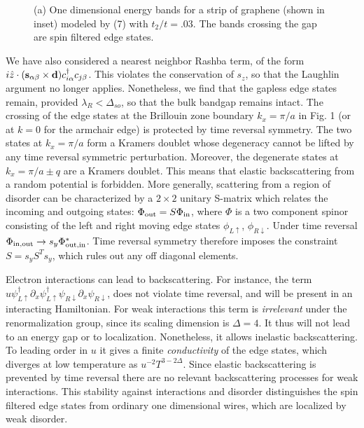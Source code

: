 \documentclass[twocolumn,showpacs,floatfix,prl]{revtex4}
\begin{document}
\begin{figure}
 \centerline{  }
 \caption{(a) One dimensional energy bands for a strip of graphene (shown in inset)
 modeled by (7) with $t_2/t=.03$.  The bands crossing the gap are spin filtered
  edge states.}
 \end{figure}

We have also considered a nearest neighbor Rashba term, of the form
$i\hat z\cdot({\bf s}_{\alpha\beta}\times{\bf d})c_{i\alpha}^\dagger
c_{j\beta}$.  This violates the conservation of $s_z$, so that the Laughlin
argument no longer applies.  Nonetheless, we find that the gapless
edge states remain, provided $\lambda_R<\Delta_{so}$, so that the bulk
bandgap remains intact.
The crossing of the edge states at the Brillouin zone boundary $k_x = \pi/a$ in
Fig. 1 (or at $k=0$ for the armchair edge) is protected by time
reversal symmetry.  The two states at $k_x=\pi/a$ form a Kramers
doublet whose degeneracy cannot be lifted by any time reversal
symmetric perturbation.  Moreover, the degenerate
states at $k_x = \pi/a \pm q$ are a Kramers doublet.  This means that
elastic backscattering from a random potential is forbidden.
More generally, scattering from a region of disorder can be characterized by a $2\times
2$ unitary S-matrix which relates the incoming and outgoing states:
$\Phi_{\rm out} = S \Phi_{\rm in}$, where $\Phi$ is a two component
spinor consisting of the left and right moving edge states
$\phi_{L\uparrow}$, $\phi_{R\downarrow}$.  Under time reversal
$\Phi_{\rm in,out} \rightarrow s_y \Phi^*_{\rm out,in}$.
Time reversal symmetry therefore imposes the constraint $S = s_y S^T s_y$, which
 rules out any off diagonal elements.

Electron interactions can lead to backscattering.
For instance, the term
$u \psi_{L\uparrow}^\dagger\partial_x \psi_{L\uparrow}^\dagger
\psi_{R\downarrow}\partial_x\psi_{R\downarrow}$,
does not violate time reversal, and will
be present in an interacting Hamiltonian.  For weak
interactions this term is {\it irrelevant} under the renormalization
group, since its scaling
dimension is $\Delta = 4$.  It thus will not lead to an
energy gap or to localization.  Nonetheless, it allows
inelastic backscattering.  To leading order in $u$ it gives a
finite {\it conductivity} of the edge states, which diverges
at low temperature as $u^{-2}T^{3-2\Delta}$\cite{giamarchi}.  Since
elastic backscattering is prevented by time reversal there
are no relevant backscattering processes for weak interactions.
This stability against interactions and disorder
distinguishes the spin filtered edge states from ordinary
one dimensional wires, which are localized by weak disorder.
\end{document}
